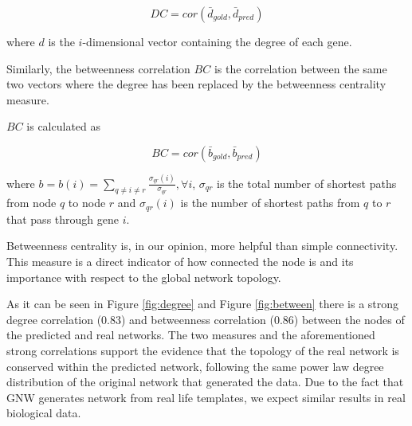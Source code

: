 \begin{equation}
DC = cor(\bar{d}_{gold}, \bar{d}_{pred})
\label{eq:degree}
\end{equation}

where $d$ is the $i$-dimensional vector containing the degree of each gene. 

Similarly, the betweenness correlation $BC$ is the correlation between the same two vectors where the degree has been replaced by the betweenness centrality measure.

$BC$ is calculated as 

\begin{equation}
BC = cor(\bar{b}_{gold}, \bar{b}_{pred}) 
\label{eq:betweenness}
\end{equation}


where $b=b(i)=\sum_{q \ne i \ne r} \frac{\sigma_{qr}(i) } {\sigma_{qr} } , \forall i$, $\sigma_{qr}$ is the total number of shortest paths from node $q$ to node $r$ and $\sigma_{qr}(i)$ is the number of shortest paths from $q$ to $r$ that pass through gene $i$.


Betweenness centrality is, in our opinion, more helpful than simple connectivity. This measure is a direct indicator of how connected the node is and its importance with respect to the global network topology. 

As it can be seen in Figure \ref{fig:degree} and Figure \ref{fig:between} there is a strong degree correlation (0.83) and betweenness correlation (0.86) between the nodes of the predicted and real networks. The two measures and the aforementioned strong correlations support the evidence that the topology of the real network is conserved within the predicted network, following the same power law degree distribution of the original network that generated the data. 
Due to the fact that GNW generates network from real life templates, we expect  similar results in real biological data.


